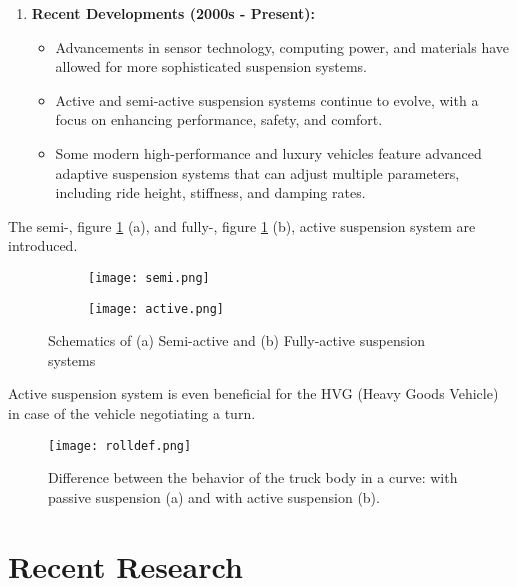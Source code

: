 \begin{enumerate}
	\item \textbf{Recent Developments (2000s - Present):}
	\begin{itemize}
		
		\item Advancements in sensor technology, computing power, and materials have allowed for more sophisticated suspension systems.
		\item Active and semi-active suspension systems continue to evolve, with a focus on enhancing performance, safety, and comfort.
		\item Some modern high-performance and luxury vehicles feature advanced adaptive suspension systems that can adjust multiple parameters, including ride height, stiffness, and damping rates.
	\end{itemize}
\end{enumerate}
The semi-, figure \ref{fig:semi and active} (a), and fully-, figure \ref{fig:semi and active} (b), active suspension system are introduced. \cite{alashtari2023fuzzy}

\begin{figure}[H]
	\centering
	\begin{subfigure}{.35\textwidth}
		\centering
		\texttt{[image: semi.png]}
	\end{subfigure}%
	\begin{subfigure}{.35\textwidth}
		\centering
		\texttt{[image: active.png]}
	\end{subfigure}
	\caption{Schematics of (a) Semi-active and (b) Fully-active suspension systems \cite{wong2001theory}}
	\label{fig:semi and active}
\end{figure}

Active suspension system is even beneficial for the HVG (Heavy Goods Vehicle) in case of the vehicle negotiating a turn.

\begin{figure}[H]
	\centering
	\texttt{[image: rolldef.png]}
	\caption{Difference between the behavior of the truck body in a curve: with passive suspension (a) and with active suspension (b). \cite{hamza2022intelligent}}
	\label{fig:rolldef}
\end{figure}

\section{Recent Research}
